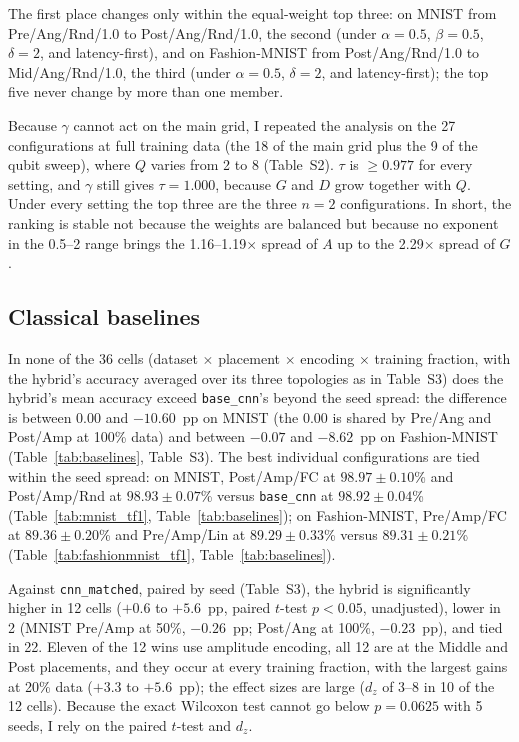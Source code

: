 \documentclass{ieeeaccess}
\begin{document}
The first place changes only within the equal-weight top three: on MNIST from Pre/Ang/Rnd/1.0 to Post/Ang/Rnd/1.0, the second (under $\alpha = 0.5$, $\beta = 0.5$, $\delta = 2$, and latency-first), and on Fashion-MNIST from Post/Ang/Rnd/1.0 to Mid/Ang/Rnd/1.0, the third (under $\alpha = 0.5$, $\delta = 2$, and latency-first); the top five never change by more than one member.

Because $\gamma$ cannot act on the main grid, I repeated the analysis on the 27 configurations at full training data (the 18 of the main grid plus the 9 of the qubit sweep), where $Q$ varies from 2 to 8 (Table~S2). $\tau$ is $\geq 0.977$ for every setting, and $\gamma$ still gives $\tau = 1.000$, because $G$ and $D$ grow together with $Q$. Under every setting the top three are the three $n = 2$ configurations. In short, the ranking is stable not because the weights are balanced but because no exponent in the 0.5--2 range brings the 1.16--1.19$\times$ spread of $A$ up to the 2.29$\times$ spread of $G$.

\subsection{Classical baselines}
\label{sec:res-base}

In none of the 36 cells (dataset $\times$ placement $\times$ encoding $\times$ training fraction, with the hybrid's accuracy averaged over its three topologies as in Table~S3) does the hybrid's mean accuracy exceed \texttt{base\_cnn}'s beyond the seed spread: the difference is between 0.00 and $-10.60$~pp on MNIST (the 0.00 is shared by Pre/Ang and Post/Amp at 100\% data) and between $-0.07$ and $-8.62$~pp on Fashion-MNIST (Table~\ref{tab:baselines}, Table~S3). The best individual configurations are tied within the seed spread: on MNIST, Post/Amp/FC at $98.97 \pm 0.10$\% and Post/Amp/Rnd at $98.93 \pm 0.07$\% versus \texttt{base\_cnn} at $98.92 \pm 0.04$\% (Table~\ref{tab:mnist_tf1}, Table~\ref{tab:baselines}); on Fashion-MNIST, Pre/Amp/FC at $89.36 \pm 0.20$\% and Pre/Amp/Lin at $89.29 \pm 0.33$\% versus $89.31 \pm 0.21$\% (Table~\ref{tab:fashionmnist_tf1}, Table~\ref{tab:baselines}).

Against \texttt{cnn\_matched}, paired by seed (Table~S3), the hybrid is significantly higher in 12 cells ($+0.6$ to $+5.6$~pp, paired $t$-test $p < 0.05$, unadjusted), lower in 2 (MNIST Pre/Amp at 50\%, $-0.26$~pp; Post/Ang at 100\%, $-0.23$~pp), and tied in 22. Eleven of the 12 wins use amplitude encoding, all 12 are at the Middle and Post placements, and they occur at every training fraction, with the largest gains at 20\% data ($+3.3$ to $+5.6$~pp); the effect sizes are large ($d_z$ of 3--8 in 10 of the 12 cells). Because the exact Wilcoxon test cannot go below $p = 0.0625$ with 5 seeds, I rely on the paired $t$-test and $d_z$.
\end{document}
